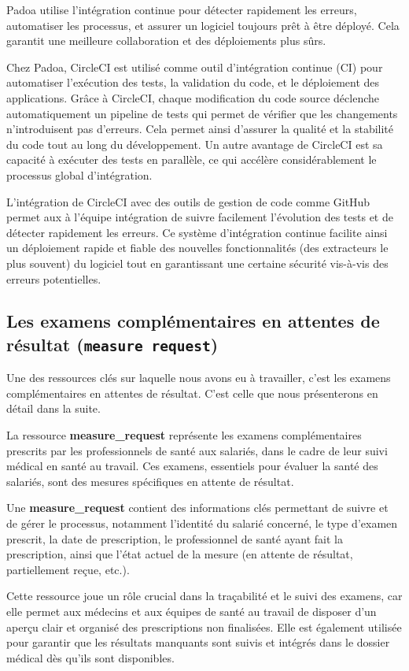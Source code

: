 Padoa utilise l’intégration continue pour détecter rapidement les erreurs, automatiser les processus, et assurer un logiciel toujours prêt à être déployé. Cela garantit une meilleure collaboration et des déploiements plus sûrs.

Chez Padoa, CircleCI est utilisé comme outil d'intégration continue (CI) pour automatiser l'exécution des tests, la validation du code, et le déploiement des applications. Grâce à CircleCI, chaque modification du code source déclenche automatiquement un pipeline de tests qui permet de vérifier que les changements n’introduisent pas d’erreurs. Cela permet ainsi d’assurer la qualité et la stabilité du code tout au long du développement. Un autre avantage de CircleCI est sa capacité à exécuter des tests en parallèle, ce qui accélère considérablement le processus global d'intégration.

L'intégration de CircleCI avec des outils de gestion de code comme GitHub permet aux à l'équipe intégration de suivre facilement l’évolution des tests et de détecter rapidement les erreurs. Ce système d'intégration continue facilite ainsi un déploiement rapide et fiable des nouvelles fonctionnalités (des extracteurs le plus souvent) du logiciel tout en garantissant une certaine sécurité vis-à-vis des erreurs potentielles.


\subsection{Les examens complémentaires en attentes de résultat (\texttt{measure request})}

Une des ressources clés sur laquelle nous avons eu à travailler, c'est les examens complémentaires en attentes de résultat. C'est celle que nous présenterons en détail dans la suite.

La ressource \textbf{measure\_request} représente les examens complémentaires prescrits par les professionnels de santé aux salariés, dans le cadre de leur suivi médical en santé au travail. Ces examens, essentiels pour évaluer la santé des salariés, sont des mesures spécifiques en attente de résultat. 

Une \textbf{measure\_request} contient des informations clés permettant de suivre et de gérer le processus, notamment l’identité du salarié concerné, le type d’examen prescrit, la date de prescription, le professionnel de santé ayant fait la prescription, ainsi que l’état actuel de la mesure (en attente de résultat, partiellement reçue, etc.).

Cette ressource joue un rôle crucial dans la traçabilité et le suivi des examens, car elle permet aux médecins et aux équipes de santé au travail de disposer d’un aperçu clair et organisé des prescriptions non finalisées. Elle est également utilisée pour garantir que les résultats manquants sont suivis et intégrés dans le dossier médical dès qu’ils sont disponibles. 



